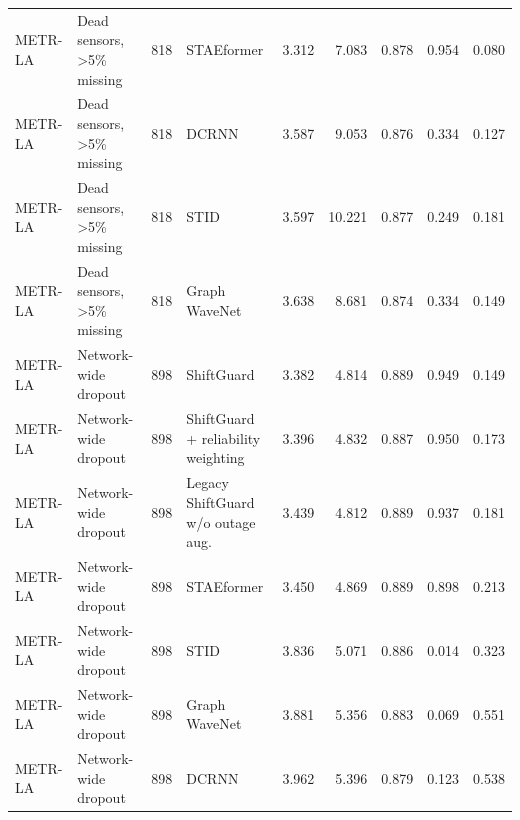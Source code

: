 \begin{tabular}{llrlrrrrr}
METR-LA & Dead sensors, >5\% missing & 818 & STAEformer & 3.312 & 7.083 & 0.878 & 0.954 & 0.080 \\
METR-LA & Dead sensors, >5\% missing & 818 & DCRNN & 3.587 & 9.053 & 0.876 & 0.334 & 0.127 \\
METR-LA & Dead sensors, >5\% missing & 818 & STID & 3.597 & 10.221 & 0.877 & 0.249 & 0.181 \\
METR-LA & Dead sensors, >5\% missing & 818 & Graph WaveNet & 3.638 & 8.681 & 0.874 & 0.334 & 0.149 \\
METR-LA & Network-wide dropout & 898 & ShiftGuard & 3.382 & 4.814 & 0.889 & 0.949 & 0.149 \\
METR-LA & Network-wide dropout & 898 & ShiftGuard + reliability weighting & 3.396 & 4.832 & 0.887 & 0.950 & 0.173 \\
METR-LA & Network-wide dropout & 898 & Legacy ShiftGuard w/o outage aug. & 3.439 & 4.812 & 0.889 & 0.937 & 0.181 \\
METR-LA & Network-wide dropout & 898 & STAEformer & 3.450 & 4.869 & 0.889 & 0.898 & 0.213 \\
METR-LA & Network-wide dropout & 898 & STID & 3.836 & 5.071 & 0.886 & 0.014 & 0.323 \\
METR-LA & Network-wide dropout & 898 & Graph WaveNet & 3.881 & 5.356 & 0.883 & 0.069 & 0.551 \\
METR-LA & Network-wide dropout & 898 & DCRNN & 3.962 & 5.396 & 0.879 & 0.123 & 0.538 \\
\bottomrule
\end{tabular}

